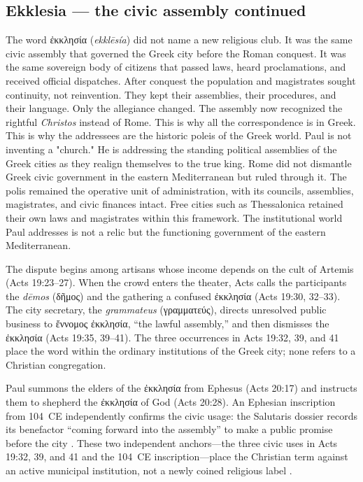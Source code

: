 \subsection{Ekklesia --- the civic assembly continued}\label{subsec:ekklesia-the-civic-assembly-continued}

The word ἐκκλησία (\textit{ekklēsía}) did not name a new religious club.
It was the same civic assembly that governed the Greek city before the Roman conquest.
It was the same sovereign body of citizens that passed laws, heard proclamations, and received official dispatches.
After conquest the population and magistrates sought continuity, not reinvention.
They kept their assemblies, their procedures, and their language.
Only the allegiance changed.
The assembly now recognized the rightful \textit{Christos} instead of Rome.
This is why all the correspondence is in Greek.
This is why the addressees are the historic poleis of the Greek world.
Paul is not inventing a "church."
He is addressing the standing political assemblies of the Greek cities as they realign themselves to the true king.
Rome did not dismantle Greek civic government in the eastern Mediterranean but ruled through it.
The polis remained the operative unit of administration, with its councils, assemblies, magistrates, and civic finances intact.
Free cities such as Thessalonica retained their own laws and magistrates within this framework.
The institutional world Paul addresses is not a relic but the functioning government of the eastern Mediterranean.

The dispute begins among artisans whose income depends on the cult of Artemis (Acts 19:23--27).
When the crowd enters the theater, Acts calls the participants the \emph{dēmos} (δῆμος) and the gathering a confused ἐκκλησία (Acts 19:30, 32--33).
The city secretary, the \emph{grammateus} (γραμματεύς), directs unresolved public business to ἔννομος ἐκκλησία, ``the lawful assembly,'' and then dismisses the ἐκκλησία (Acts 19:35, 39--41).
The three occurrences in Acts 19:32, 39, and 41 place the word within the ordinary institutions of the Greek city; none refers to a Christian congregation.

Paul summons the elders of the ἐκκλησία from Ephesus (Acts 20:17) and instructs them to shepherd the ἐκκλησία of God (Acts 20:28).
An Ephesian inscription from 104~CE independently confirms the civic usage: the Salutaris dossier records its benefactor ``coming forward into the assembly'' to make a public promise before the city \cite[421]{zuiderhoek:political-sociology}.
These two independent anchors---the three civic uses in Acts 19:32, 39, and 41 and the 104~CE inscription---place the Christian term against an active municipal institution, not a newly coined religious label \cite[421]{zuiderhoek:political-sociology}\cite[547--548]{vankooten:ekklesia}.

